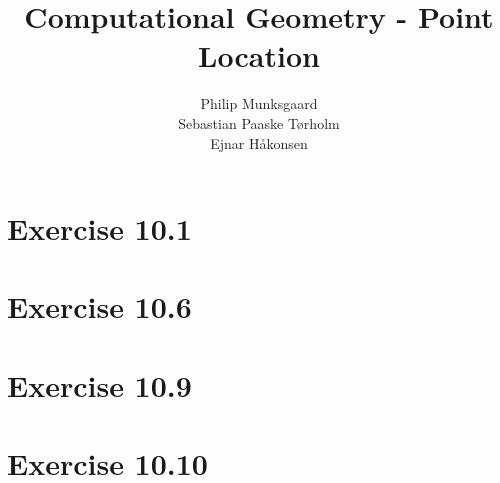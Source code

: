 \documentclass[11pt,a4paper]{article}
\title{Computational Geometry - Point Location}
\author{Philip Munksgaard \\ Sebastian Paaske Tørholm \\ Ejnar Håkonsen}
\begin{document}
\maketitle

\section{Exercise 10.1}

\section{Exercise 10.6}

\section{Exercise 10.9}

\section{Exercise 10.10}
\end{document}
